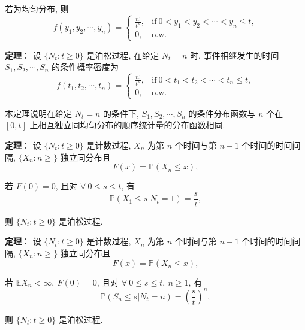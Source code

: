 \documentclass[openany]{ctexbook}
\theoremstyle{kaiti}
\theoremstyle{normal}
\begin{document}
  若为均匀分布, 则
\begin{equation}
    f(y_1,y_2,\cdots,y_n)=
    \begin{cases}
      \displaystyle \frac{n!}{t^n}, &\text{if}~0 < y_1 < y_2 < \cdots < y_n \leqslant t,\\
      0, &\text{o.w.}
    \end{cases}
\end{equation}
  
\textbf{定理}：  
  设 $\{N_t:t\geqslant0\}$ 是泊松过程, 在给定 $N_t=n$ 时, 事件相继发生的时间 $S_1,S_2,\cdots,S_n$ 的条件概率密度为
\begin{equation}
    f(t_1,t_2,\cdots,t_n)=
    \begin{cases}
      \displaystyle \frac{n!}{t^n}, &\text{if}~0 < t_1 < t_2 < \cdots < t_n \leqslant t,\\
      0, &\text{o.w.}
    \end{cases}
\end{equation}
  
  本定理说明在给定 $N_t=n$ 的条件下, $S_1,S_2,\cdots,S_n$ 的条件分布函数与 $n$ 个在 $[0,t]$ 上相互独立同均匀分布的顺序统计量的分布函数相同.
  
\textbf{定理}：  
  设 $\{N_t:t\geqslant0\}$ 是计数过程, $X_n$ 为第 $n$ 个时间与第 $n-1$ 个时间的时间间隔, $\{X_n:n\geqslant\}$ 独立同分布且 
\begin{equation}
    F(x)=\mathbb{P}(X_n\leqslant x),
\end{equation}
  
  若 $F(0)=0$, 且对 $\forall~0 \leqslant s \leqslant t$, 有
\begin{equation}
    \mathbb{P}(X_1\leqslant s|N_t=1)=\frac{s}{t},
\end{equation}
  
  则 $\{N_t:t\geqslant0\}$ 是泊松过程.
  
\textbf{定理}：  
  设 $\{N_t:t\geqslant0\}$ 是计数过程, $X_n$ 为第 $n$ 个时间与第 $n-1$ 个时间的时间间隔, $\{X_n:n\geqslant\}$ 独立同分布且 
\begin{equation}
    F(x)=\mathbb{P}(X_n\leqslant x),
\end{equation}
  
  若 $\mathbb{E}X_n < \infty,~F(0)=0$, 且对 $\forall~0 \leqslant s \leqslant t,~n\geqslant1$, 有
\begin{equation}
    \mathbb{P}(S_n\leqslant s|N_t=n)=\left(\frac{s}{t}\right)^n,
\end{equation}
  
  则 $\{N_t:t\geqslant0\}$ 是泊松过程.
  
\end{document}
